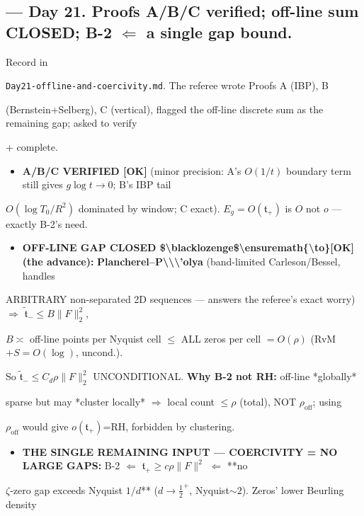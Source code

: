 \documentclass[10pt]{article}
\begin{document}
\subsection*{ --- Day 21. Proofs A/B/C verified; off-line sum CLOSED; B-2 \ensuremath{\Leftarrow} a single gap bound.}
Record in\par
\texttt{Day21-offline-and-coercivity.md}. The referee wrote Proofs A (IBP), B\par
(Bernstein+Selberg), C (vertical), flagged the off-line discrete sum as the remaining gap; asked to verify\par
+ complete.\par
\begin{itemize}
\item \textbf{A/B/C VERIFIED [OK]} (minor precision: A's $O(1/t)$ boundary term still gives $g\log t\to0$; B's IBP tail
\end{itemize}
  $O(\log T_0/R^2)$ dominated by window; C exact). $E_g=O(\mathfrak t_+)$ is $O$ not $o$ --- exactly B-2's need.\par
\begin{itemize}
\item \textbf{OFF-LINE GAP CLOSED \$\textbackslash{}blacklozenge\$\textbackslash{}ensuremath\{\textbackslash{}to\}[OK] (the advance):} \textbf{Plancherel--P\textbackslash{}\textbackslash{}\textbackslash{}'olya} (band-limited Carleson/Bessel, handles
\end{itemize}
  ARBITRARY non-separated 2D sequences --- answers the referee's exact worry) \ensuremath{\Rightarrow} $\widetilde{\mathfrak t}_-\le B\|F\|_2^2$,\par
  $B\asymp$ off-line points per Nyquist cell $\le$ ALL zeros per cell $=O(\rho)$ (RvM$+S=O(\log)$, uncond.).\par
  So $\widetilde{\mathfrak t}_-\le C_d\rho\|F\|_2^2$ UNCONDITIONAL. \textbf{Why B-2 not RH:} off-line *globally*\par
  sparse but may *cluster locally* \ensuremath{\Rightarrow} local count $\le\rho$ (total), NOT $\rho_{\mathrm{off}}$; using\par
  $\rho_{\mathrm{off}}$ would give $o(\mathfrak t_+)$=RH, forbidden by clustering.\par
\begin{itemize}
\item \textbf{THE SINGLE REMAINING INPUT --- COERCIVITY = NO LARGE GAPS:} B-2 \ensuremath{\Leftarrow} $\mathfrak t_+\ge c\rho\|F\|^2$ \ensuremath{\Leftarrow} **no
\end{itemize}
  $\zeta$-zero gap exceeds Nyquist $1/d$** ($d\to\tfrac12^+$, Nyquist$\sim2$). Zeros' lower Beurling density\par
\end{document}
